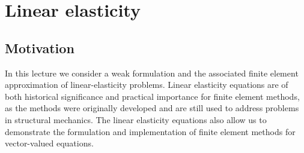 \chapter{Linear elasticity}

\disclaimer

\section{Motivation}
In this lecture we consider a weak formulation and the associated finite element approximation of linear-elasticity problems.  Linear elasticity equations are of both historical significance and practical importance for finite element methods, as the methods were originally developed and are still used to address problems in structural mechanics.  The linear elasticity equations also allow us to demonstrate the formulation and implementation of finite element methods for vector-valued equations.

